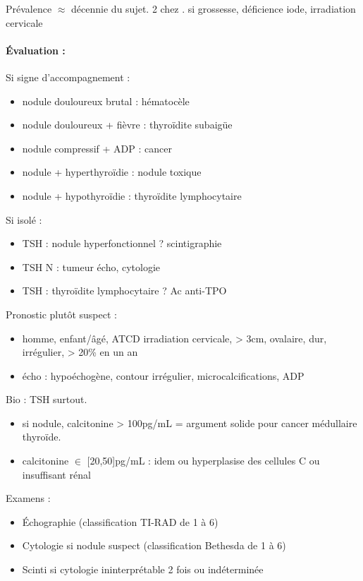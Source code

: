 \documentclass[11pt]{article}
\begin{document}
Prévalence \(\approx\) décennie du sujet. \texttimes{} 2 chez \female. \inc si grossesse,
déficience iode, irradiation cervicale

\paragraph{Évaluation :}
\label{sec:org56e3847}
Si signe d'accompagnement :
\begin{itemize}
\item nodule douloureux brutal : hématocèle
\item nodule douloureux + fièvre : thyroïdite subaigüe
\item nodule compressif + ADP : cancer
\item nodule + hyperthyroïdie : nodule toxique
\item nodule + hypothyroïdie : thyroïdite lymphocytaire
\end{itemize}
Si isolé : 
\begin{itemize}
\item TSH \dec : nodule hyperfonctionnel ? \thus scintigraphie
\item TSH N : tumeur \thus écho, cytologie
\item TSH \inc : thyroïdite lymphocytaire ? \thus Ac anti-TPO
\end{itemize}

Pronostic plutôt suspect : 
\begin{itemize}
\item homme, enfant/âgé, ATCD irradiation cervicale, > 3cm, ovalaire, dur, irrégulier, > 20\% en un an
\item écho : hypoéchogène, contour irrégulier, microcalcifications, ADP
\end{itemize}

Bio : TSH surtout. 
\begin{itemize}
\item si nodule, calcitonine > 100pg/mL = argument solide pour cancer médullaire thyroïde.
\item calcitonine \(\in\) [20,50]pg/mL : idem ou hyperplasise des cellules C ou insuffisant rénal
\end{itemize}

Examens : 
\begin{itemize}
\item Échographie (classification TI-RAD de 1 à 6)
\item Cytologie si nodule suspect (classification Bethesda de 1 à 6)
\item Scinti si cytologie ininterprétable 2 fois ou indéterminée
\end{itemize}
\end{document}
